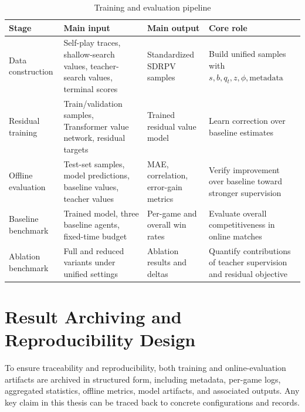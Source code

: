 \begin{table}[htbp]
\centering
\caption{Training and evaluation pipeline}
\label{tab:training_and_evaluation_pipeline}
\begin{tabular}{p{2.5cm}p{3.2cm}p{3.1cm}p{3.8cm}}
\toprule
Stage & Main input & Main output & Core role \\
\midrule
Data construction & Self-play traces, shallow-search values, teacher-search values, terminal scores & Standardized SDRPV samples & Build unified samples with $s,b,q_t,z,\phi,\text{metadata}$ \\
Residual training & Train/validation samples, Transformer value network, residual targets & Trained residual value model & Learn correction over baseline estimates \\
Offline evaluation & Test-set samples, model predictions, baseline values, teacher values & MAE, correlation, error-gain metrics & Verify improvement over baseline toward stronger supervision \\
Baseline benchmark & Trained model, three baseline agents, fixed-time budget & Per-game and overall win rates & Evaluate overall competitiveness in online matches \\
Ablation benchmark & Full and reduced variants under unified settings & Ablation results and deltas & Quantify contributions of teacher supervision and residual objective \\
\bottomrule
\end{tabular}
\end{table}


\section{Result Archiving and Reproducibility Design}


To ensure traceability and reproducibility, both training and online-evaluation artifacts are archived in structured form, including metadata, per-game logs, aggregated statistics, offline metrics, model artifacts, and associated outputs. Any key claim in this thesis can be traced back to concrete configurations and records.

